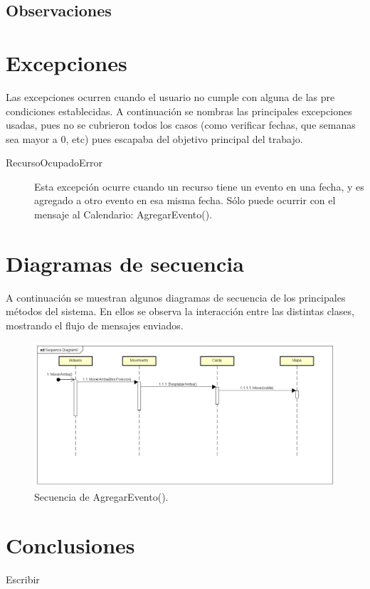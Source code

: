 \documentclass[titlepage,a4paper]{article}
\begin{document}
\subsection{Observaciones}



\section{Excepciones}\label{sec:excepciones}
Las excepciones ocurren cuando el usuario no cumple con alguna de las pre condiciones establecidas. A continuación se nombras las principales excepciones usadas, pues no se cubrieron todos los casos (como verificar fechas, que semanas sea mayor a 0, etc) pues escapaba del objetivo principal del trabajo.

\begin{description}
\item[RecursoOcupadoError] Esta excepción ocurre cuando un recurso tiene un evento en una fecha, y es agregado a otro evento en esa misma fecha. Sólo puede ocurrir con el mensaje al Calendario: AgregarEvento().

\end{description}

\section{Diagramas de secuencia}\label{sec:diagramasdesecuencia}

A continuación se muestran algunos diagramas de secuencia de los principales métodos del sistema. En ellos se observa la interacción entre las distintas clases, mostrando el flujo de mensajes enviados.

\begin{figure}[H]
\centering
\includegraphics[width=1.15\textwidth]{mover.png}
\caption{\label{fig:seq01}Secuencia de AgregarEvento().}
\end{figure}





\section{Conclusiones}\label{sec:conclusiones}

Escribir
\end{document}
